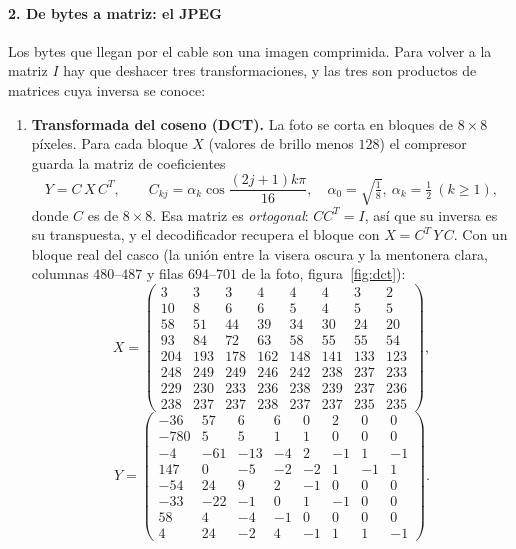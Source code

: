 \paragraph{2. De bytes a matriz: el JPEG} Los bytes que llegan por el cable son
una imagen comprimida. Para volver a la matriz $I$ hay que deshacer tres
transformaciones, y las tres son productos de matrices cuya inversa se conoce:
\begin{enumerate}
  \item \textbf{Transformada del coseno (DCT).} La foto se corta en bloques de
        $8\times8$ píxeles. Para cada bloque $X$ (valores de brillo menos $128$) el
        compresor guarda la matriz de coeficientes
        \begin{equation}
        Y = C\,X\,C^{T},\qquad
        C_{kj}=\alpha_k\cos\frac{(2j+1)k\pi}{16},\quad
        \alpha_0=\sqrt{\tfrac18},\ \alpha_k=\tfrac12\ (k\ge1),
        \end{equation}
        donde $C$ es de $8\times8$. Esa matriz es \emph{ortogonal}: $CC^T=I$, así que
        su inversa es su transpuesta, y el decodificador recupera el bloque con
        $X=C^{T}\,Y\,C$. Con un bloque real del casco (la unión entre la visera oscura y la mentonera clara,
        columnas $480$--$487$ y filas $694$--$701$ de la foto, figura~\ref{fig:dct}):
        \begin{equation*}
        X=\begin{pmatrix} 3 & 3 & 3 & 4 & 4 & 4 & 3 & 2 \\ 10 & 8 & 6 & 6 & 5 & 4 & 5 & 5 \\ 58 & 51 & 44 & 39 & 34 & 30 & 24 & 20 \\ 93 & 84 & 72 & 63 & 58 & 55 & 55 & 54 \\ 204 & 193 & 178 & 162 & 148 & 141 & 133 & 123 \\ 248 & 249 & 249 & 246 & 242 & 238 & 237 & 233 \\ 229 & 230 & 233 & 236 & 238 & 239 & 237 & 236 \\ 238 & 237 & 237 & 238 & 237 & 237 & 235 & 235 \end{pmatrix} ,
        \end{equation*}
        \begin{equation*}
        Y=\begin{pmatrix} -36 & 57 & 6 & 6 & 0 & 2 & 0 & 0 \\ -780 & 5 & 5 & 1 & 1 & 0 & 0 & 0 \\ -4 & -61 & -13 & -4 & 2 & -1 & 1 & -1 \\ 147 & 0 & -5 & -2 & -2 & 1 & -1 & 1 \\ -54 & 24 & 9 & 2 & -1 & 0 & 0 & 0 \\ -33 & -22 & -1 & 0 & 1 & -1 & 0 & 0 \\ 58 & 4 & -4 & -1 & 0 & 0 & 0 & 0 \\ 4 & 24 & -2 & 4 & -1 & 1 & 1 & -1 \end{pmatrix} .

\end{equation*}
\end{enumerate}
